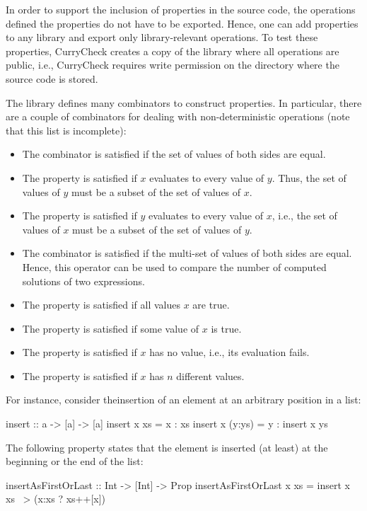 In order to support the inclusion of properties in the source code,
the operations defined the properties do not have to be exported.
Hence, one can add properties to any library and export only
library-relevant operations. To test these properties,
CurryCheck creates a copy of the library where all operations
are public, i.e., CurryCheck requires write permission on the
directory where the source code is stored.

The library  defines many combinators
to construct properties. In particular, there are a couple of
combinators for dealing with non-deterministic operations
(note that this list is incomplete):
\begin{itemize}
\item
The combinator  is satisfied if the set of values
of both sides are equal.
\item
The property  is satisfied if $x$
evaluates to every value of $y$.
Thus, the set of values of $y$ must be a subset of the set of values of $x$.
\item
The property  is satisfied if $y$
evaluates to every value of $x$, i.e.,
the set of values of $x$ must be a subset of the set of values of $y$.
\item
The combinator  is satisfied
if the multi-set of values of both sides are equal.
Hence, this operator can be used to compare the number
of computed solutions of two expressions.
\item
The property  is satisfied if all values $x$ are true.
\item
The property  is satisfied if some value
of $x$ is true.
\item
The property  is satisfied if $x$ has no value,
i.e., its evaluation fails.
\item
The property  is satisfied if $x$ has $n$
different values.
\end{itemize}
%
For instance, consider theinsertion of an element at an arbitrary
position in a list:
\begin{curry}
insert :: a -> [a] -> [a]
insert x xs     = x : xs
insert x (y:ys) = y : insert x ys
\end{curry}
The following property states that the element is inserted
(at least) at the beginning or the end of the list:
\begin{curry}
insertAsFirstOrLast :: Int -> [Int] -> Prop
insertAsFirstOrLast x xs = insert x xs ~> (x:xs ? xs++[x])
\end{curry}
